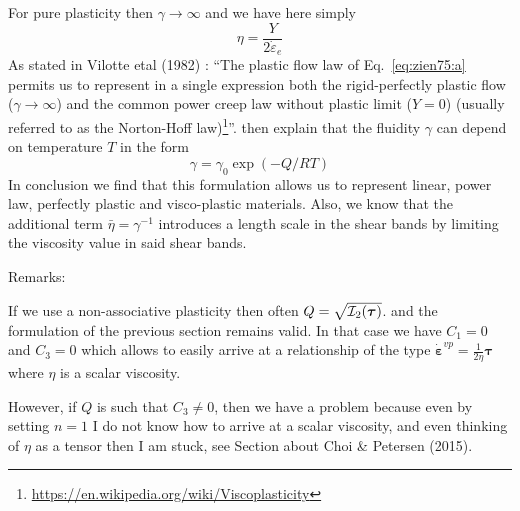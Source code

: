 For pure plasticity then $\gamma \rightarrow \infty$ and we have here simply
\[
\eta = \frac{Y}{2  \dot\varepsilon_e}
\]
As stated in Vilotte etal (1982) \cite{vidm82}: ``The plastic
flow law of Eq.~\eqref{eq:zien75:a} permits us to
represent in a single expression both the rigid-perfectly plastic flow
($\gamma\rightarrow \infty$)
and the common power creep law without plastic limit ($Y=0$)
(usually referred to as the Norton-Hoff law)\footnote{\url{https://en.wikipedia.org/wiki/Viscoplasticity}}''.
\textcite{vidm82} then explain that the fluidity $\gamma$ can depend on 
temperature $T$ in the form 
\[
\gamma = \gamma_0 \exp(-Q/RT)
\]
In conclusion we find that this formulation allows us to represent linear, power law,
perfectly plastic and visco-plastic materials.
Also, we know that the additional term $\bar\eta=\gamma^{-1}$ introduces a length scale
in the shear bands by limiting the viscosity value in said shear bands.

Remarks:


If we use a non-associative plasticity then often $Q=\sqrt{{\cal I}_2(\bm\tau)}$.
and the formulation of the previous section remains valid. In that case 
we have $C_1=0$ and $C_3=0$ which allows to easily arrive at a relationship 
of the type $\dot{\bm\varepsilon}^{vp} = \frac{1}{2\eta} \bm\tau$ where 
$\eta$ is a scalar viscosity. 

However, if $Q$ is such that $C_3\neq 0$, then we have a problem because 
even by setting $n=1$ I do not know how to arrive at a scalar viscosity, 
and even thinking of $\eta$ as a tensor then I am stuck, see Section about 
Choi \& Petersen (2015).





